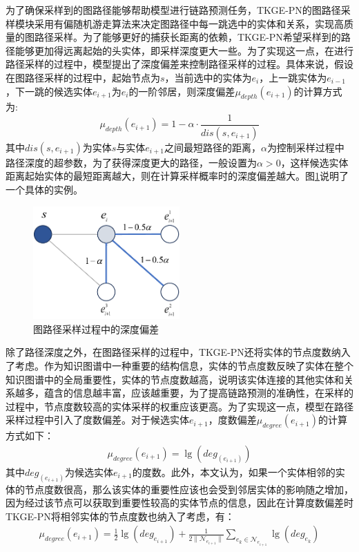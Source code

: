 为了确保采样到的图路径能够帮助模型进行链路预测任务，TKGE-PN的图路径采样模块采用有偏随机游走算法来决定图路径中每一跳选中的实体和关系，实现高质量的图路径采样。为了能够更好的捕获长距离的依赖，TKGE-PN希望采样到的路径能够更加得远离起始的头实体，即采样深度更大一些。为了实现这一点，在进行路径采样的过程中，模型提出了深度偏差来控制路径采样的过程。具体来说，假设在图路径采样的过程中，起始节点为$s$，当前选中的实体为$e_i$，上一跳实体为$e_{i-1}$，下一跳的候选实体$e_{i+1}$为$e_i$的一阶邻居，则深度偏差$\mu_{depth}(e_{i+1})$的计算方式为:
\begin{equation}
  \mu_{depth}(e_{i+1})=1-\alpha\cdot\frac{1}{dis(s,e_{i+1})}
\end{equation}
其中$dis(s,e_{i+1})$为实体$s$与实体$e_{i+1}$之间最短路径的距离，$\alpha$为控制采样过程中路径深度的超参数，为了获得深度更大的路径，一般设置为$\alpha>0$，这样候选实体距离起始实体的最短距离越大，则在计算采样概率时的深度偏差越大。图\ref{depth_bias}说明了一个具体的实例。

\begin{figure}[htbp]
  \centerline{\includegraphics[width=0.5\textwidth]{pic/depth_bias.pdf}}
  \caption{图路径采样过程中的深度偏差}
  \label{depth_bias}
\end{figure}

除了路径深度之外，在图路径采样的过程中，TKGE-PN还将实体的节点度数纳入了考虑。作为知识图谱中一种重要的结构信息，实体的节点度数反映了实体在整个知识图谱中的全局重要性，实体的节点度数越高，说明该实体连接的其他实体和关系越多，蕴含的信息越丰富，应该越重要，为了提高链路预测的准确性，在采样的过程中，节点度数较高的实体采样的权重应该更高。为了实现这一点，模型在路径采样过程中引入了度数偏差。对于候选实体$e_{i+1}$，度数偏差$\mu_{degree}(e_{i+1})$的计算方式如下：
\begin{gather}
  \mu_{degree}(e_{i+1})=\lg(deg_{(e_{i+1})})
\end{gather}
其中$deg_{(e_{i+1})}$为候选实体$e_{i+1}$的度数。此外，本文认为，如果一个实体相邻的实体的节点度数很高，那么该实体的重要性应该也会受到邻居实体的影响随之增加，因为经过该节点可以获取到重要性较高的实体节点的信息，因此在计算度数偏差时TKGE-PN将相邻实体的节点度数也纳入了考虑，有：
\begin{gather}
  \mu_{degree}(e_{i+1})=\frac{1}{2}\lg(deg_{e_{i+1}})+\frac{1}{2\|\mathcal{N}_{e_{i+1}}\|}\sum_{e_k\in\mathcal{N}_{e_{i+1}}}\lg(deg_{e_k})
\end{gather}

